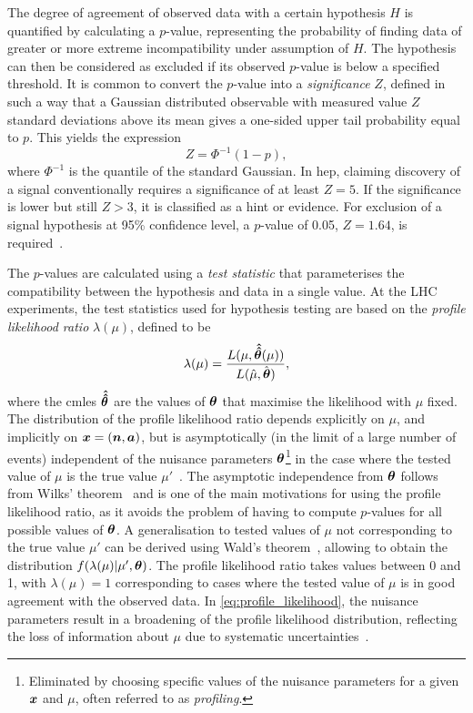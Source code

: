 The degree of agreement of observed data with a certain hypothesis $H$ is quantified by calculating a $p$-value, representing the probability of finding data of greater or more extreme incompatibility under assumption of $H$. The hypothesis can then be considered as excluded if its observed $p$-value is below a specified threshold. It is common to convert the $p$-value into a \textit{significance} $Z$, defined in such a way that a Gaussian distributed observable with measured value $Z$ standard deviations above its mean gives a one-sided upper tail probability equal to $p$. This yields the expression
\begin{equation}
	Z = \Phi^{-1}(1-p),
	\label{eq:significance}
\end{equation}
where $\Phi^{-1}$ is the quantile of the standard Gaussian. In \gls{hep}, claiming discovery of a signal conventionally requires a significance of at least $Z=5$. If the significance is lower but still $Z>3$, it is classified as a hint or evidence. For exclusion of a signal hypothesis at 95\% confidence level, a $p$-value of 0.05, \ie $Z = 1.64$, is required~\cite{Cowan:2010js}. 

The $p$-values are calculated using a \textit{test statistic} that parameterises the compatibility between the hypothesis and data in a single value. At the LHC experiments, the test statistics used for hypothesis testing are based on the \textit{profile likelihood ratio} $\lambda(\mu)$, defined to be
\begin{equation}
	\lambda(\mu) = \frac{L(\mu,\makemebold{\hat{\hat{\theta}}}(\mu))}{L(\hat{\mu},\hat{\makemebold{\theta}})},
	\label{eq:profile_likelihood}
\end{equation}
where the \glspl{cmle} $\makemebold{\hat{\hat{\theta}}}$ are the values of $\makemebold{\theta}$ that maximise the likelihood with $\mu$ fixed. The distribution of the profile likelihood ratio depends explicitly on $\mu$, and implicitly on $\makemebold{x} = (\makemebold{n},\makemebold{a})$, but is asymptotically  (\ie in the limit of a large number of events) independent of the nuisance parameters $\makemebold{\theta}$\footnote{Eliminated by choosing specific values of the nuisance parameters for a given $\makemebold{x}$ and $\mu$, often referred to as \textit{profiling}.} in the case where the tested value of $\mu$ is the true value $\mu'$~\cite{Cranmer:2015nia}. The asymptotic independence from $\makemebold{\theta}$ follows from Wilks' theorem~\cite{wilks1938} and is one of the main motivations for using the profile likelihood ratio, as it avoids the problem of having to compute $p$-values for all possible values of $\makemebold{\theta}$. A generalisation to tested values of $\mu$ not corresponding to the true value $\mu'$ can be derived using Wald's theorem~\cite{wald10.2307/1990256}, allowing to obtain the distribution $f(\lambda(\mu)\vert \mu',\makemebold{\theta})$. The profile likelihood ratio takes values between 0 and 1, with $\lambda(\mu) = 1$ corresponding to cases where the tested value of $\mu$ is in good agreement with the observed data. In \cref{eq:profile_likelihood}, the nuisance parameters result in a broadening of the profile likelihood distribution, reflecting the loss of information about $\mu$ due to systematic uncertainties~\cite{Cowan:2010js}.

